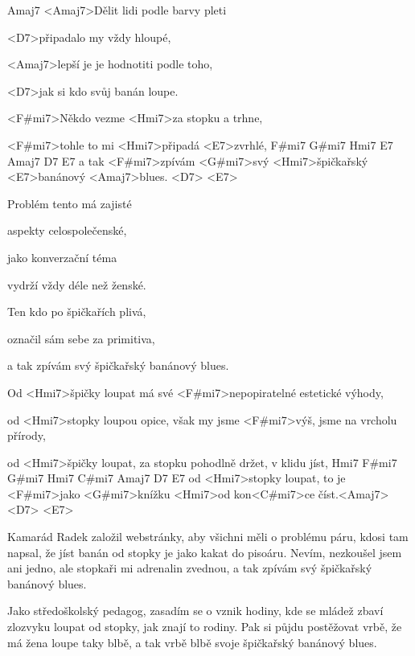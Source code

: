 

    Amaj7 
\zs
   <Amaj7>Dělit lidi podle barvy pleti 
   
   <D7>připadalo my vždy hloupé,
   
   <Amaj7>lepší je je hodnotiti podle toho,

   <D7>jak si kdo svůj banán loupe.

   <F#mi7>Někdo vezme <Hmi7>za stopku a trhne,

   <F#mi7>tohle to mi <Hmi7>připadá <E7>zvrhlé,
         F#mi7 G#mi7 Hmi7       E7       Amaj7 D7 E7
   a tak <F#mi7>zpívám <G#mi7>svý <Hmi7>špičkařský <E7>banánový <Amaj7>blues. <D7> <E7>
\ks

\zs
   Problém tento má zajisté

   aspekty celospolečenské,

   jako konverzační téma

   vydrží vždy déle než ženské.

   Ten kdo po špičkařích plivá,

   označil sám sebe za primitiva,

   a tak zpívám svý špičkařský banánový blues.
\ks

\zr
   Od <Hmi7>špičky loupat má své <F#mi7>nepopiratelné estetické výhody,

   od <Hmi7>stopky loupou opice, však my jsme <F#mi7>výš, jsme na vrcholu přírody,

   od <Hmi7>špičky loupat, za stopku pohodlně držet, v klidu jíst,
       Hmi7                F#mi7 G#mi7 Hmi7  C#mi7  Amaj7 D7 E7
   od <Hmi7>stopky loupat, to je <F#mi7>jako <G#mi7>knížku <Hmi7>od kon<C#mi7>ce číst.<Amaj7> <D7> <E7>
\kr

\zs
  Kamarád Radek založil webstránky,
   aby všichni měli o problému páru,
   kdosi tam napsal, že jíst banán od stopky
   je jako kakat do pisoáru.
   Nevím, nezkoušel jsem ani jedno,
   ale stopkaři mi adrenalin zvednou,
   a tak zpívám svý špičkařský banánový blues.
\ks

\zr
\kr   

\zs
   Jako středoškolský pedagog,
   zasadím se o vznik hodiny,
   kde se mládež zbaví zlozvyku
   loupat od stopky, jak znají to rodiny.
   Pak si půjdu postěžovat vrbě,
   že má žena loupe taky blbě,
   a tak vrbě blbě svoje špičkařský banánový blues.
\ks

\kp
